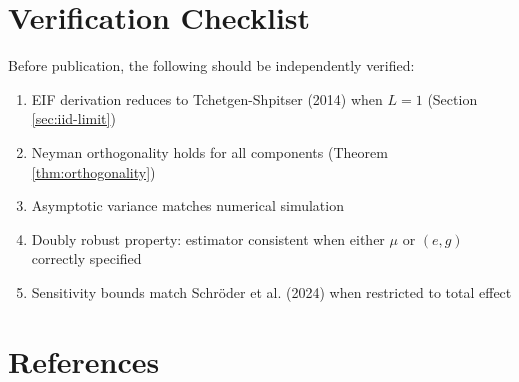 \documentclass[11pt]{article}
\theoremstyle{plain}
\theoremstyle{definition}
\theoremstyle{remark}
\begin{document}
\section{Verification Checklist}
\label{sec:checklist}

Before publication, the following should be independently verified:

\begin{enumerate}[itemsep=3pt]
    \item[$\square$] EIF derivation reduces to Tchetgen-Shpitser (2014) when $L=1$ (Section \ref{sec:iid-limit})
    \item[$\square$] Neyman orthogonality holds for all components (Theorem \ref{thm:orthogonality})
    \item[$\square$] Asymptotic variance matches numerical simulation
    \item[$\square$] Doubly robust property: estimator consistent when either $\mu$ or $(e, g)$ correctly specified
    \item[$\square$] Sensitivity bounds match Schröder et al. (2024) when restricted to total effect
\end{enumerate}

\section*{References}
\end{document}
